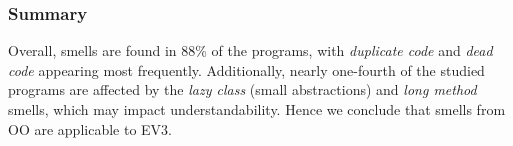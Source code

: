 \documentclass[conference]{IEEEtran}
\newcommand{\mbs}{\textsc{my blocks}}
\newcommand{\mb}{\textsc{my block}}
\begin{document}
%
%
%


\subsubsection{Summary}
Overall, smells are found in 88\% of the programs, with \emph{duplicate code} and \emph{dead code} appearing most frequently. Additionally, nearly one-fourth of the studied programs are affected by the  \emph{lazy class} (small abstractions)  and \emph{long method} smells, which may impact understandability.  Hence we conclude that smells from OO are applicable to EV3. %
\end{document}
